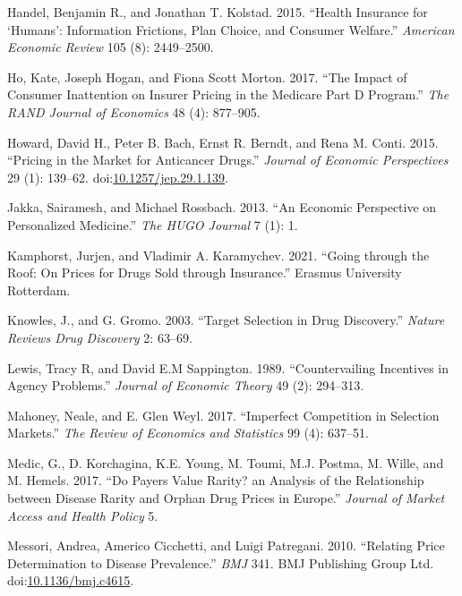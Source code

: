 \documentclass[a4paper,12pt]{article}
\begin{document}
\hypertarget{citeproc_bib_item_21}{Handel, Benjamin R., and Jonathan T. Kolstad. 2015. “Health Insurance for ‘Humans’: Information Frictions, Plan Choice, and Consumer Welfare.” \textit{American Economic Review} 105 (8): 2449–2500.}

\hypertarget{citeproc_bib_item_22}{Ho, Kate, Joseph Hogan, and Fiona Scott Morton. 2017. “The Impact of Consumer Inattention on Insurer Pricing in the Medicare Part D Program.” \textit{The RAND Journal of Economics} 48 (4): 877–905.}

\hypertarget{citeproc_bib_item_23}{Howard, David H., Peter B. Bach, Ernst R. Berndt, and Rena M. Conti. 2015. “Pricing in the Market for Anticancer Drugs.” \textit{Journal of Economic Perspectives} 29 (1): 139–62. doi:\href{https://doi.org/10.1257/jep.29.1.139}{10.1257/jep.29.1.139}.}

\hypertarget{citeproc_bib_item_24}{Jakka, Sairamesh, and Michael Rossbach. 2013. “An Economic Perspective on Personalized Medicine.” \textit{The HUGO Journal} 7 (1): 1.}

\hypertarget{citeproc_bib_item_25}{Kamphorst, Jurjen, and Vladimir A. Karamychev. 2021. “Going through the Roof: On Prices for Drugs Sold through Insurance.” Erasmus University Rotterdam.}

\hypertarget{citeproc_bib_item_26}{Knowles, J., and G. Gromo. 2003. “Target Selection in Drug Discovery.” \textit{Nature Reviews Drug Discovery} 2: 63–69.}

\hypertarget{citeproc_bib_item_27}{Lewis, Tracy R, and David E.M Sappington. 1989. “Countervailing Incentives in Agency Problems.” \textit{Journal of Economic Theory} 49 (2): 294–313.}

\hypertarget{citeproc_bib_item_28}{Mahoney, Neale, and E. Glen Weyl. 2017. “Imperfect Competition in Selection Markets.” \textit{The Review of Economics and Statistics} 99 (4): 637–51.}

\hypertarget{citeproc_bib_item_29}{Medic, G., D. Korchagina, K.E. Young, M. Toumi, M.J. Postma, M. Wille, and M. Hemels. 2017. “Do Payers Value Rarity? an Analysis of the Relationship between Disease Rarity and Orphan Drug Prices in Europe.” \textit{Journal of Market Access and Health Policy} 5.}

\hypertarget{citeproc_bib_item_30}{Messori, Andrea, Americo Cicchetti, and Luigi Patregani. 2010. “Relating Price Determination to Disease Prevalence.” \textit{BMJ} 341. BMJ Publishing Group Ltd. doi:\href{https://doi.org/10.1136/bmj.c4615}{10.1136/bmj.c4615}.}
\end{document}
